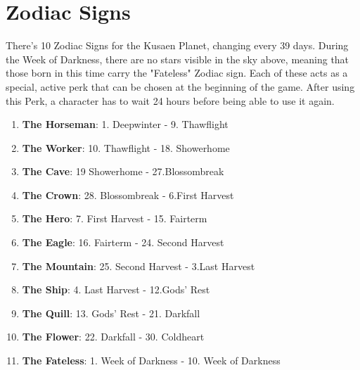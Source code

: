 \section{Zodiac Signs}
There's 10 Zodiac Signs for the Kusaen Planet, changing every 39 days. During the Week of Darkness, there are no stars visible in the sky above, meaning that those born in this time carry the "Fateless" Zodiac sign. Each of these acts as a special, active perk that can be chosen at the beginning of the game. After using this Perk, a character has to wait 24 hours before being able to use it again.\\

\begin{enumerate}
	\item \textbf{The Horseman}: 1. Deepwinter - 9. Thawflight
	\item \textbf{The Worker}: 10. Thawflight - 18. Showerhome
	\item \textbf{The Cave}: 19 Showerhome - 27.Blossombreak
	\item \textbf{The Crown}: 28. Blossombreak - 6.First Harvest
	\item \textbf{The Hero}: 7. First Harvest - 15. Fairterm
	\item \textbf{The Eagle}: 16. Fairterm - 24. Second Harvest
	\item \textbf{The Mountain}: 25. Second Harvest - 3.Last Harvest
	\item \textbf{The Ship}: 4. Last Harvest - 12.Gods' Rest
	\item \textbf{The Quill}: 13. Gods' Rest - 21. Darkfall
	\item \textbf{The Flower}: 22. Darkfall - 30. Coldheart
	\item \textbf{The Fateless}: 1. Week of Darkness - 10. Week of Darkness
\end{enumerate}












